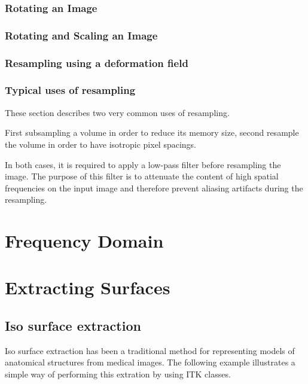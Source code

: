 \subsubsection{Rotating an Image}
\ifitkFullVersion

\fi

\subsubsection{Rotating and Scaling an Image}
\ifitkFullVersion

\fi

\subsubsection{Resampling using a deformation field}
\ifitkFullVersion

\fi


\subsubsection{Typical uses of resampling}

These section describes two very common uses of resampling.

First subsampling a volume in order to reduce its memory size, second resample
the volume in order to have isotropic pixel spacings.

In both cases, it is required to apply a low-pass filter before resampling the
image. The purpose of this filter is to attenuate the content of high spatial
frequencies on the input image and therefore prevent aliasing artifacts during
the resampling. 

\ifitkFullVersion

\fi


\ifitkFullVersion

\fi


\section{Frequency Domain}
\label{sec:FrequencyDomain}

\ifitkFullVersion

\fi

\ifitkFullVersion

\fi


\section{Extracting Surfaces}
\label{sec:ExtractingSurfaces}

\subsection{Iso surface extraction}

Iso surface extraction has been a traditional method for representing models of
anatomical structures from medical images. The following example illustrates a
simple way of performing this extration by using ITK classes.


\ifitkFullVersion

\fi





